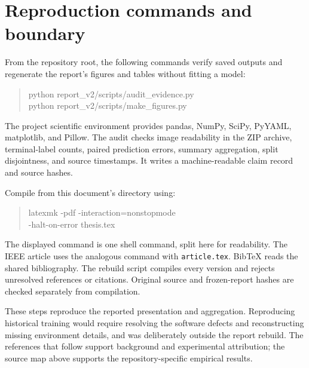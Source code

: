 \section{Reproduction commands and boundary}
From the repository root, the following commands verify saved outputs and regenerate the report's figures and tables without fitting a model:
\begin{quote}\small\ttfamily
python report\_v2/scripts/audit\_evidence.py\\
python report\_v2/scripts/make\_figures.py
\end{quote}
The project scientific environment provides pandas, NumPy, SciPy, PyYAML, matplotlib, and Pillow. The audit checks image readability in the ZIP archive, terminal-label counts, paired prediction errors, summary aggregation, split disjointness, and source timestamps. It writes a machine-readable claim record and source hashes.

Compile from this document's directory using:
\begin{quote}\small\ttfamily
latexmk -pdf -interaction=nonstopmode\\
\hspace*{1em}-halt-on-error thesis.tex
\end{quote}
The displayed command is one shell command, split here for readability. The IEEE article uses the analogous command with \texttt{article.tex}. BibTeX reads the shared bibliography. The rebuild script compiles every version and rejects unresolved references or citations. Original source and frozen-report hashes are checked separately from compilation.

These steps reproduce the reported presentation and aggregation. Reproducing historical training would require resolving the software defects and reconstructing missing environment details, and was deliberately outside the report rebuild. The references that follow support background and experimental attribution; the source map above supports the repository-specific empirical results.
